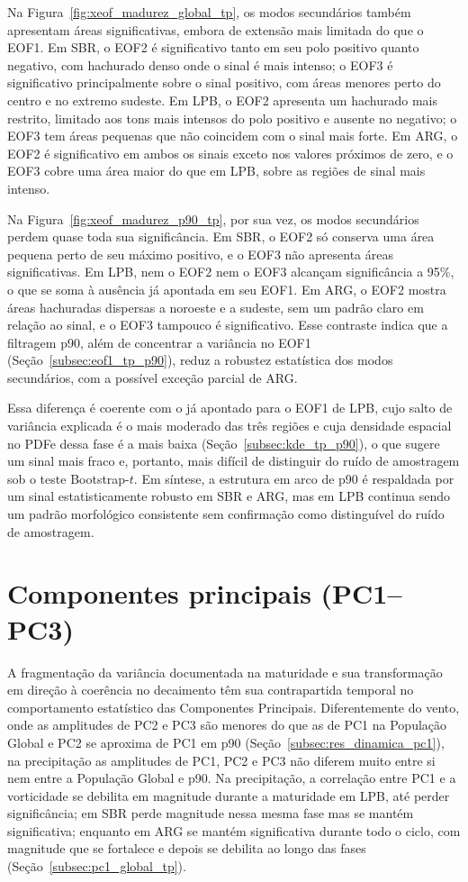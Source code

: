 Na Figura~\ref{fig:xeof_madurez_global_tp}, os modos secundários também apresentam áreas significativas, embora de extensão mais limitada do que o EOF1. Em SBR, o EOF2 é significativo tanto em seu polo positivo quanto negativo, com hachurado denso onde o sinal é mais intenso; o EOF3 é significativo principalmente sobre o sinal positivo, com áreas menores perto do centro e no extremo sudeste. Em LPB, o EOF2 apresenta um hachurado mais restrito, limitado aos tons mais intensos do polo positivo e ausente no negativo; o EOF3 tem áreas pequenas que não coincidem com o sinal mais forte. Em ARG, o EOF2 é significativo em ambos os sinais exceto nos valores próximos de zero, e o EOF3 cobre uma área maior do que em LPB, sobre as regiões de sinal mais intenso.

Na Figura~\ref{fig:xeof_madurez_p90_tp}, por sua vez, os modos secundários perdem quase toda sua significância. Em SBR, o EOF2 só conserva uma área pequena perto de seu máximo positivo, e o EOF3 não apresenta áreas significativas. Em LPB, nem o EOF2 nem o EOF3 alcançam significância a 95\%, o que se soma à ausência já apontada em seu EOF1. Em ARG, o EOF2 mostra áreas hachuradas dispersas a noroeste e a sudeste, sem um padrão claro em relação ao sinal, e o EOF3 tampouco é significativo. Esse contraste indica que a filtragem p90, além de concentrar a variância no EOF1 (Seção~\ref{subsec:eof1_tp_p90}), reduz a robustez estatística dos modos secundários, com a possível exceção parcial de ARG.

Essa diferença é coerente com o já apontado para o EOF1 de LPB, cujo salto de variância explicada é o mais moderado das três regiões e cuja densidade espacial no PDFe dessa fase é a mais baixa (Seção~\ref{subsec:kde_tp_p90}), o que sugere um sinal mais fraco e, portanto, mais difícil de distinguir do ruído de amostragem sob o teste Bootstrap-$t$. Em síntese, a estrutura em arco de p90 é respaldada por um sinal estatisticamente robusto em SBR e ARG, mas em LPB continua sendo um padrão morfológico consistente sem confirmação como distinguível do ruído de amostragem.

\section{Componentes principais (PC1--PC3)}\label{sec:dinamica_pc1_tp}

A fragmentação da variância documentada na maturidade e sua transformação em direção à coerência no decaimento têm sua contrapartida temporal no comportamento estatístico das Componentes Principais. Diferentemente do vento, onde as amplitudes de PC2 e PC3 são menores do que as de PC1 na População Global e PC2 se aproxima de PC1 em p90 (Seção~\ref{subsec:res_dinamica_pc1}), na precipitação as amplitudes de PC1, PC2 e PC3 não diferem muito entre si nem entre a População Global e p90. Na precipitação, a correlação entre PC1 e a vorticidade se debilita em magnitude durante a maturidade em LPB, até perder significância; em SBR perde magnitude nessa mesma fase mas se mantém significativa; enquanto em ARG se mantém significativa durante todo o ciclo, com magnitude que se fortalece e depois se debilita ao longo das fases (Seção~\ref{subsec:pc1_global_tp}).

